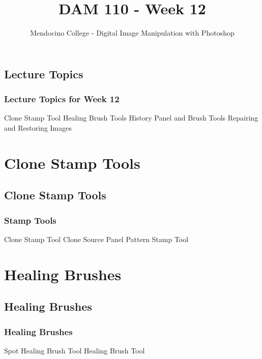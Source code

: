 \documentclass{beamer}
\title{DAM 110 - Week 12}
\author{Mendocino College - Digital Image Manipulation with Photoshop}
\date{\vspace{-5em}}
\begin{document}
	{
		\begin{frame}
			\vspace{-35pt}
			\maketitle
		\end{frame}
	}

	\section{}
			\subsection{Lecture Topics}		
	\begin{frame}
		\frametitle{Lecture Topics for Week 12}
				\begin{outline}
					\1 Clone Stamp Tool
					\1 Healing Brush Tools
					\1 History Panel and Brush Tools
					\1 Repairing and Restoring Images
				\end{outline}
		\end{frame}

	\section{Clone Stamp Tools}
			\subsection{Clone Stamp Tools}		
				\begin{frame}
					\frametitle{Stamp Tools}
					\begin{outline}
						\1 Clone Stamp Tool
						\1 Clone Source Panel
						\1 Pattern Stamp Tool
					\end{outline}
				\end{frame}
			
	\section{Healing Brushes}
		\subsection{Healing Brushes}		
			\begin{frame}
				\frametitle{Healing Brushes}
				\begin{outline}
					\1 Spot Healing Brush Tool
					\1 Healing Brush Tool
				\end{outline}
			\end{frame}
			
\end{document}
